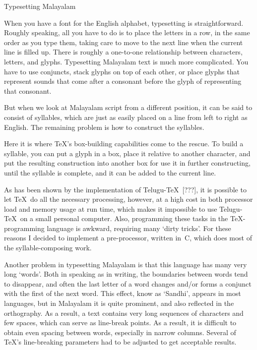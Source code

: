 \beginsection Typesetting Malayalam

When you have a font for the English alphabet, typesetting is 
straightforward. Roughly speaking, all you have to do is to place the 
letters in a row, in the same order as you type them, taking care to 
move to the next line when the current line is filled up. There is 
roughly a one-to-one relationship between characters, letters, and 
glyphs. Typesetting Malayalam text is much more complicated. You have 
to use conjuncts, stack glyphs on top of each other, or place glyphs 
that represent sounds that come after a consonant before the glyph of 
representing that consonant.

But when we look at Malayalam script from a different position, it can 
be said to consist of syllables, which are just as easily placed on a 
line from left to right as English. The remaining problem is how to 
construct the syllables.

Here it is where \TeX's box-building capabilities come to the rescue. 
To build a syllable, you can put a glyph in a box, place it relative 
to another character, and put the resulting construction into another 
box for use it in further constructing, until the syllable is 
complete, and it can be added to the current line.

As has been shown by the implementation of Telugu-\TeX\ [???], it is 
possible to let \TeX\ do all the necessary processing, however, at a 
high cost in both processor load and memory usage at run time, which 
makes it impossible to use Telugu-\TeX\ on a small personal computer. 
Also, programming these tasks in the \TeX-programming language is 
awkward, requiring many `dirty tricks'. For these reasons I decided to 
implement a pre-processor, written in~C, which does most of the 
syllable-composing work.

Another problem in typesetting Malayalam is that this language has 
many very long `words'. Both in speaking as in writing, the boundaries 
between words tend to disappear, and often the last letter of a word 
changes and/or forms a conjunct with the first of the next word. This 
effect, know as `Sandhi', appears in most languages, but in Malayalam 
it is quite prominent, and also reflected in the orthography. As a 
result, a text contains very long sequences of characters and few 
spaces, which can serve as line-break points. As a result, it is 
difficult to obtain even spacing between words, especially in narrow 
columns. Several of \TeX's line-breaking parameters had to be adjusted 
to get acceptable results.

